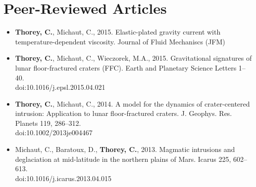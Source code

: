\documentclass[]{friggeri-cv}
\begin{document}
\section{Peer-Reviewed Articles}
\begin{itemize}
\item \textbf{Thorey, C.}, Michaut,  C., 2015.  Elastic-plated gravity
  current  with  temperature-dependent  viscosity.  Journal  of  Fluid
  Mechaniscs (JFM)
\item  \textbf{Thorey,  C.},  Michaut,   C.,  Wieczorek,  M.A.,  2015.
  Gravitational  signatures of  lunar  floor-fractured craters  (FFC).
  Earth         and          Planetary         Science         Letters
  1–40. \\
  doi:10.1016/j.epsl.2015.04.021
\item \textbf{Thorey, C.}, Michaut, C., 2014. A model for the dynamics
  of crater-centered  intrusion: Application to  lunar floor-fractured
  craters.       J.       Geophys.        Res.       Planets      119,
  286–312. \\
  doi:10.1002/2013je004467
\item Michaut,  C., Baratoux, D., \textbf{Thorey,  C.}, 2013. Magmatic
  intrusions and  deglaciation at mid-latitude in  the northern plains
  of Mars. Icarus 225, 602–613. \\
  doi:10.1016/j.icarus.2013.04.015
\end{itemize}
\end{document}
